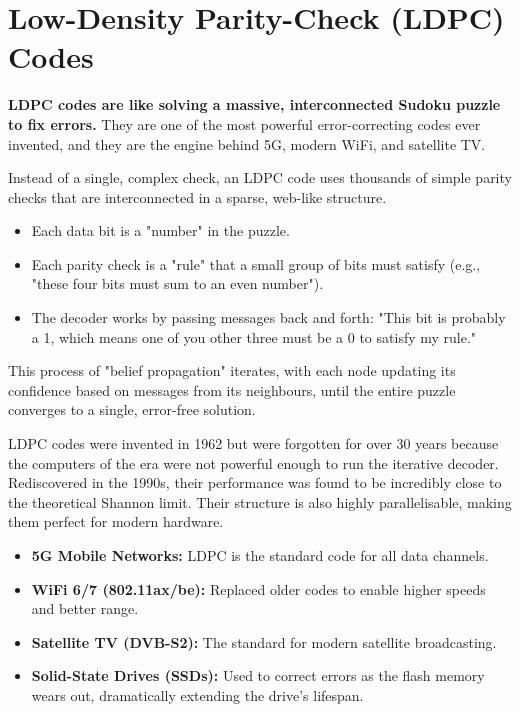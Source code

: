 
\chapter{Low-Density Parity-Check (LDPC) Codes}
\label{ch:ldpc}

\begin{nontechnical}
    \textbf{LDPC codes are like solving a massive, interconnected Sudoku puzzle to fix errors.} They are one of the most powerful error-correcting codes ever invented, and they are the engine behind 5G, modern WiFi, and satellite TV.

    Instead of a single, complex check, an LDPC code uses thousands of simple parity checks that are interconnected in a sparse, web-like structure.
    \begin{itemize}
        \item Each data bit is a "number" in the puzzle.
        \item Each parity check is a "rule" that a small group of bits must satisfy (e.g., "these four bits must sum to an even number").
        \item The decoder works by passing messages back and forth: "This bit is probably a 1, which means one of you other three must be a 0 to satisfy my rule."
    \end{itemize}
    This process of "belief propagation" iterates, with each node updating its confidence based on messages from its neighbours, until the entire puzzle converges to a single, error-free solution.

    LDPC codes were invented in 1962 but were forgotten for over 30 years because the computers of the era were not powerful enough to run the iterative decoder. Rediscovered in the 1990s, their performance was found to be incredibly close to the theoretical Shannon limit. Their structure is also highly parallelisable, making them perfect for modern hardware.

    \begin{itemize}
        \item \textbf{5G Mobile Networks:} LDPC is the standard code for all data channels.
        \item \textbf{WiFi 6/7 (802.11ax/be):} Replaced older codes to enable higher speeds and better range.
        \item \textbf{Satellite TV (DVB-S2):} The standard for modern satellite broadcasting.
        \item \textbf{Solid-State Drives (SSDs):} Used to correct errors as the flash memory wears out, dramatically extending the drive's lifespan.
    \end{itemize}
\end{nontechnical}


